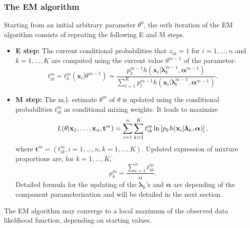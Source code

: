 \documentclass[a4paper,10pt]{article}
\newcommand{\bx}{\mathbf{x}}
\newcommand{\bt}{\mathbf{t}}
\newcommand{\balpha}{\boldsymbol{\alpha}}
\newcommand{\blambda}{\boldsymbol{\lambda}}
\begin{document}
\subsubsection{The EM algorithm}

Starting from an initial arbitrary parameter $\theta^0$, the $m$th iteration of the EM
algorithm consists of repeating the following E and M steps.
\begin{itemize}
\item {\bf E step:} The current conditional probabilities that $z_{ik}=1$ for $i=1,\ldots,n$
and $k=1,\ldots,K$ are computed using the current value $\theta^{m-1}$ of the parameter:
\begin{equation}\label{eq:condi}
t^m_{ik}=t^m_k(\bx_i|\theta^{m-1})=\frac{ p^{m-1}_kh (\bx_i|{\blambda^{m-1}_k},\balpha^{m-1} )}
{\sum_{l=1}^K  p^{m-1}_l h(\bx_i|\blambda^{m-1}_l,\balpha^{m-1})}.
\end{equation}
\item {\bf M step:} The m.l. estimate $\theta^m$ of $\theta$ is updated using the conditional
probabilities $t^m_{ik}$ as conditional mixing weights. It leads to maximize
\begin{equation} \label{eq:mStepEM}
L(\theta| {\bx}_{1},\ldots,{\bx}_{n}, {\bt}^m)
=\sum_{i=1}^{n}\sum_{k=1}^{K} t_{ik}^m \ln \left [p_{k} h({\bf x}_{i}|\blambda_{k},\balpha)\right],
\end{equation}
where ${\bt}^m=(t_{ik}^m, i=1,\ldots,n, k=1,\ldots,K)$. Updated expression of mixture
proportions are, for $k=1,\ldots,K$,
\begin{equation}
p_k^m=\frac{\sum_{i=1}^n t^m_{ik}}{n}.
\end{equation}
Detailed formula for the updating of the $\blambda_k$'s and $\balpha$ are depending of the component
parameterization and will be detailed in the next section.
\end{itemize}
The EM algorithm may converge to a local maximum of the observed data likelihood function, depending on starting
values.
\end{document}
